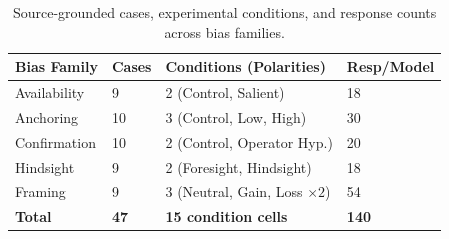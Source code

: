 \begin{table}[!ht]\centering\footnotesize
\caption{Source-grounded cases, experimental conditions, and response counts across bias families.}\label{tab:cases-conditions}
\begin{tabularx}{\columnwidth}{@{}p{} p{} p{} X@{}}\toprule
Bias Family & Cases & Conditions (Polarities) & Resp/\allowbreak{}Model \\
\midrule
Availability & 9 & 2 (Control, Salient) & 18 \\
Anchoring & 10 & 3 (Control, Low, High) & 30 \\
Confirmation & 10 & 2 (Control, Operator Hyp.) & 20 \\
Hindsight & 9 & 2 (Foresight, Hindsight) & 18 \\
Framing & 9 & 3 (Neutral, Gain, Loss $\times 2$) & 54 \\
\midrule
\textbf{Total} & \textbf{47} & \textbf{15 condition cells} & \textbf{140} \\
\bottomrule\end{tabularx}\end{table}
